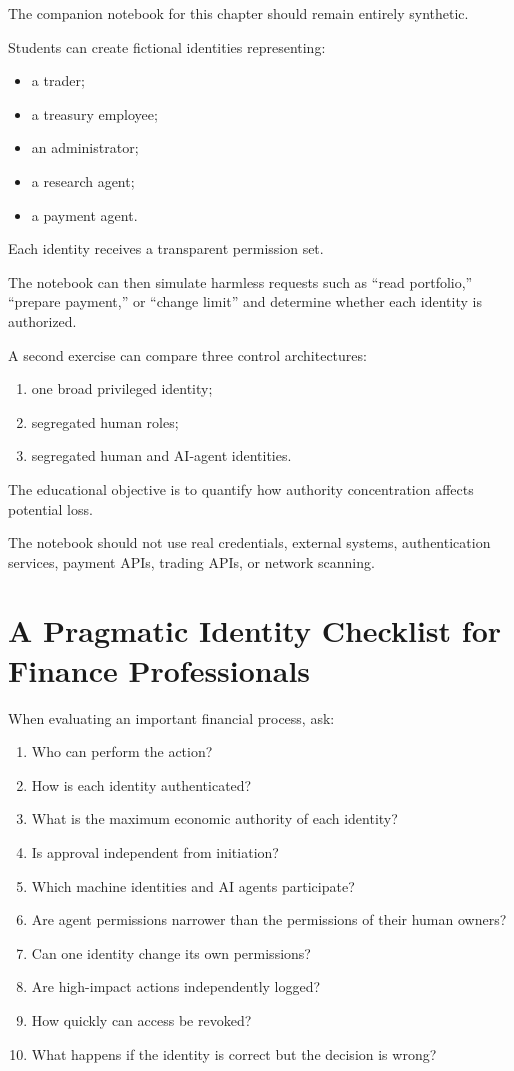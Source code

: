 \begin{notebooklab}
The companion notebook for this chapter should remain entirely synthetic.

Students can create fictional identities representing:

\begin{itemize}
    \item a trader;
    \item a treasury employee;
    \item an administrator;
    \item a research agent;
    \item a payment agent.
\end{itemize}

Each identity receives a transparent permission set.

The notebook can then simulate harmless requests such as ``read portfolio,'' ``prepare payment,'' or ``change limit'' and determine whether each identity is authorized.

A second exercise can compare three control architectures:
\begin{enumerate}
    \item one broad privileged identity;
    \item segregated human roles;
    \item segregated human and AI-agent identities.
\end{enumerate}

The educational objective is to quantify how authority concentration affects potential loss.

The notebook should not use real credentials, external systems, authentication services, payment APIs, trading APIs, or network scanning.
\end{notebooklab}

\section{A Pragmatic Identity Checklist for Finance Professionals}

When evaluating an important financial process, ask:

\begin{enumerate}
    \item Who can perform the action?
    \item How is each identity authenticated?
    \item What is the maximum economic authority of each identity?
    \item Is approval independent from initiation?
    \item Which machine identities and AI agents participate?
    \item Are agent permissions narrower than the permissions of their human owners?
    \item Can one identity change its own permissions?
    \item Are high-impact actions independently logged?
    \item How quickly can access be revoked?
    \item What happens if the identity is correct but the decision is wrong?
\end{enumerate}

